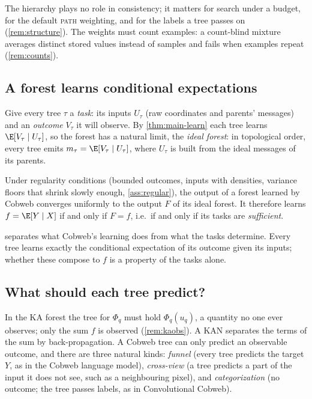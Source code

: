 The hierarchy plays no role in consistency; it matters for search under a budget, for
the default \textsc{path} weighting, and for the labels a tree passes on
(\cref{rem:structure}).  The weights must count examples: a count-blind mixture averages
distinct stored values instead of samples and fails when examples repeat
(\cref{rem:counts}).

\subsection{A forest learns conditional expectations}

Give every tree $\tau$ a \emph{task}: its inputs $U_\tau$ (raw coordinates and parents'
messages) and an \emph{outcome} $V_\tau$ it will observe.  By \cref{thm:main-learn} each
tree learns $\E[V_\tau\mid U_\tau]$, so the forest has a natural limit, the \emph{ideal
forest}: in topological order, every tree emits $m_\tau=\E[V_\tau\mid U_\tau]$, where
$U_\tau$ is built from the ideal messages of its parents.

\begin{theorem}\label{thm:main-forest}
Under regularity conditions (bounded outcomes, inputs with densities, variance floors
that shrink slowly enough, \cref{ass:regular}), the output of a forest learned by Cobweb
converges uniformly to the output $F$ of its ideal forest.  It therefore learns
$f=\E[Y\mid X]$ if and only if $F=f$, i.e.\ if and only if its tasks are
\emph{sufficient}.
\end{theorem}

 separates what Cobweb's learning does from what the tasks
determine.  Every tree learns exactly the conditional expectation of its outcome given
its inputs; whether these compose to $f$ is a property of the tasks alone.

\subsection{What should each tree predict?}\label{sec:tasks-main}

In the KA forest the tree for $\Phi_q$ must hold $\Phi_q(u_q)$, a quantity no one ever
observes; only the sum $f$ is observed (\cref{rem:kaobs}).  A KAN separates the terms of
the sum by back-propagation.  A Cobweb tree can only predict an observable outcome, and
there are three natural kinds:
\emph{funnel} (every tree predicts the target $Y$, as in the Cobweb language model),
\emph{cross-view} (a tree predicts a part of the input it does not see, such as a
neighbouring pixel), and \emph{categorization} (no outcome; the tree passes labels, as in
Convolutional Cobweb).


